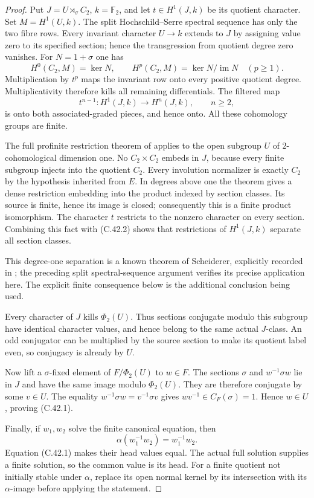 \begin{proof}
Put $J=U\rtimes_\sigma C_2$, $k=\mathbb F_2$, and let
$t\in H^1(J,k)$ be its quotient character. Set
$M=H^1(U,k)$. The split Hochschild--Serre spectral sequence has
only the two fibre rows. Every invariant character $U\to k$
extends to $J$ by assigning value zero to its specified section;
hence the transgression from quotient degree zero vanishes.
For $N=1+\sigma$ one has
\[
 H^0(C_2,M)=\ker N,\qquad
 H^p(C_2,M)=\ker N/\operatorname{im}N\quad(p\ge1).
\]
Multiplication by $t^p$ maps the invariant row onto every
positive quotient degree. Multiplicativity therefore kills all
remaining differentials. The filtered map
\[
 t^{n-1}:H^1(J,k)\longrightarrow H^n(J,k),\qquad n\ge2,
                                                                    \tag{C.42.2}
\]
is onto both associated-graded pieces, and hence onto. All these
cohomology groups are finite.

The full profinite restriction theorem of
\citet[Theorem 2 and Section 1.1]{CEKochloukovaZalesskii2007}
applies to the open subgroup $U$ of $2$-cohomological dimension
one. No $C_2\times C_2$ embeds in $J$, because every finite
subgroup injects into the quotient $C_2$. Every involution
normalizer is exactly $C_2$ by the hypothesis inherited from $E$.
In degrees above one the theorem gives a dense restriction
embedding into the product indexed by section classes. Its source
is finite, hence its image is closed; consequently this is a
finite product isomorphism. The character $t$ restricts to the
nonzero character on every section. Combining this fact with
(C.42.2) shows that restrictions of $H^1(J,k)$ separate all
section classes.

This degree-one separation is a known theorem of Scheiderer,
explicitly recorded in
\citet[Theorem 2.11 and Remark 2.12]{A_PalQuickFormal2025}; the
preceding split spectral-sequence argument verifies its precise
application here. The explicit finite consequence below is the
additional conclusion being used.

Every character of $J$ kills $\Phi_2(U)$. Thus sections conjugate
modulo this subgroup have identical character values, and hence
belong to the same actual $J$-class. An odd conjugator can be
multiplied by the source section to make its quotient label even,
so conjugacy is already by $U$.

Now lift a $\sigma$-fixed element of $F/\Phi_2(U)$ to $w\in F$.
The sections $\sigma$ and $w^{-1}\sigma w$ lie in $J$ and have
the same image modulo $\Phi_2(U)$. They are therefore conjugate
by some $v\in U$. The equality
$w^{-1}\sigma w=v^{-1}\sigma v$ gives
$wv^{-1}\in C_F(\sigma)=1$. Hence $w\in U$, proving (C.42.1).

Finally, if $w_1,w_2$ solve the finite canonical equation, then
\[
              \alpha(w_1^{-1}w_2)=w_1^{-1}w_2.
\]
Equation (C.42.1) makes their head values equal. The actual full
solution supplies a finite solution, so the common value is its
head. For a finite quotient not initially stable under $\alpha$,
replace its open normal kernel by its intersection with its
$\alpha$-image before applying the statement.
\end{proof}
